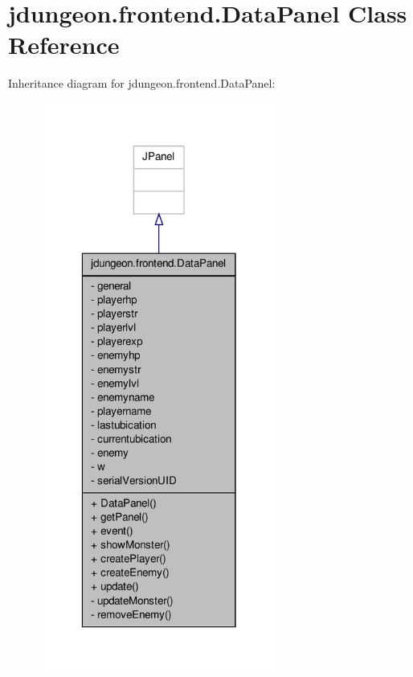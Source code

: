 \hypertarget{classjdungeon_1_1frontend_1_1_data_panel}{
\section{jdungeon.frontend.DataPanel Class Reference}
\label{classjdungeon_1_1frontend_1_1_data_panel}
}


Inheritance diagram for jdungeon.frontend.DataPanel:
\nopagebreak
\begin{figure}[H]
\begin{center}
\leavevmode
\includegraphics[width=222pt]{classjdungeon_1_1frontend_1_1_data_panel__inherit__graph}
\end{center}
\end{figure}


